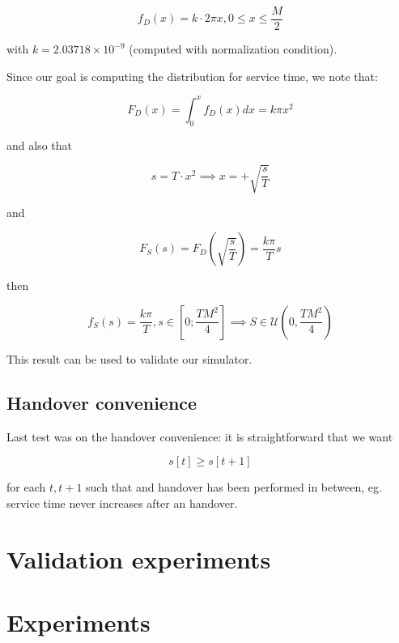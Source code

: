 \documentclass[a4paper,12pt]{article}
\begin{document}
$$ f_D(x) = k \cdot 2 \pi x, 0 \leq x \leq \frac{M}{2} $$

with $k = 2.03718 \times 10^{-9}$ (computed with normalization condition).

Since our goal is computing the distribution for service time, we note that:

$$ F_D(x) = \int_{0}^{x} f_D(x) dx = k \pi x^2 $$

and also that

$$ s = T \cdot x^2 \implies x = + \sqrt{\frac{s}{T}} $$

and

$$ F_S(s) = F_D\left(\sqrt{\frac{s}{T}}\right) = \frac{k \pi}{T} s $$

then

$$ f_S(s) = \frac{k \pi}{T}, s \in \left[0; \frac{TM^2}{4}\right] \implies S \in \mathcal{U}\left(0, \frac{TM^2}{4} \right)$$

This result can be used to validate our simulator.

\subsection{Handover convenience}
Last test was on the handover convenience: it is straightforward that we want

$$ s[t] \geq s[t + 1] $$

for each $t, t + 1$ such that and handover has been performed in between, eg. service time never increases after an handover.

\section{Validation experiments}









\section{Experiments}
\end{document}
